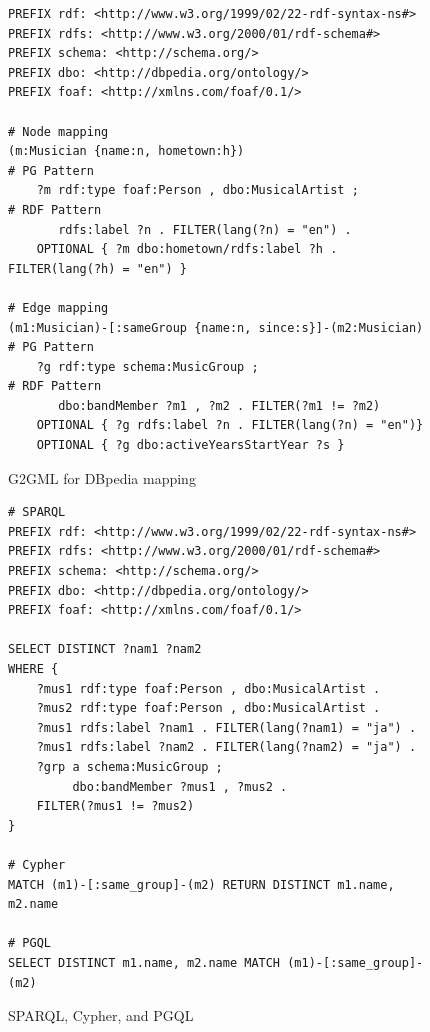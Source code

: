\documentclass[runningheads]{llncs}
\begin{document}
\begin{figure}[!t]
\vspace{2mm}
\begin{scriptsize}
\begin{verbatim}
PREFIX rdf: <http://www.w3.org/1999/02/22-rdf-syntax-ns#>
PREFIX rdfs: <http://www.w3.org/2000/01/rdf-schema#>
PREFIX schema: <http://schema.org/>
PREFIX dbo: <http://dbpedia.org/ontology/>
PREFIX foaf: <http://xmlns.com/foaf/0.1/>
 
# Node mapping
(m:Musician {name:n, hometown:h})                            # PG Pattern
    ?m rdf:type foaf:Person , dbo:MusicalArtist ;            # RDF Pattern
       rdfs:label ?n . FILTER(lang(?n) = "en") .
    OPTIONAL { ?m dbo:hometown/rdfs:label ?h . FILTER(lang(?h) = "en") }
 
# Edge mapping
(m1:Musician)-[:sameGroup {name:n, since:s}]-(m2:Musician)   # PG Pattern
    ?g rdf:type schema:MusicGroup ;                          # RDF Pattern
       dbo:bandMember ?m1 , ?m2 . FILTER(?m1 != ?m2)
    OPTIONAL { ?g rdfs:label ?n . FILTER(lang(?n) = "en")}
    OPTIONAL { ?g dbo:activeYearsStartYear ?s }
\end{verbatim}
\end{scriptsize}
\caption{G2GML for DBpedia mapping}
\label{fig:g2gml}
\end{figure}
 
\begin{figure}[!t]
\vspace{2mm}
\begin{scriptsize}
\begin{verbatim}
# SPARQL
PREFIX rdf: <http://www.w3.org/1999/02/22-rdf-syntax-ns#>
PREFIX rdfs: <http://www.w3.org/2000/01/rdf-schema#>
PREFIX schema: <http://schema.org/>
PREFIX dbo: <http://dbpedia.org/ontology/>
PREFIX foaf: <http://xmlns.com/foaf/0.1/>
 
SELECT DISTINCT ?nam1 ?nam2
WHERE {
    ?mus1 rdf:type foaf:Person , dbo:MusicalArtist .
    ?mus2 rdf:type foaf:Person , dbo:MusicalArtist .
    ?mus1 rdfs:label ?nam1 . FILTER(lang(?nam1) = "ja") .
    ?mus1 rdfs:label ?nam2 . FILTER(lang(?nam2) = "ja") .
    ?grp a schema:MusicGroup ;
         dbo:bandMember ?mus1 , ?mus2 .
    FILTER(?mus1 != ?mus2)
}

# Cypher
MATCH (m1)-[:same_group]-(m2) RETURN DISTINCT m1.name, m2.name

# PGQL
SELECT DISTINCT m1.name, m2.name MATCH (m1)-[:same_group]-(m2)
\end{verbatim}
\end{scriptsize}
\caption{SPARQL, Cypher, and PGQL}
\label{fig:sparql}
\end{figure}
 
\end{document}
